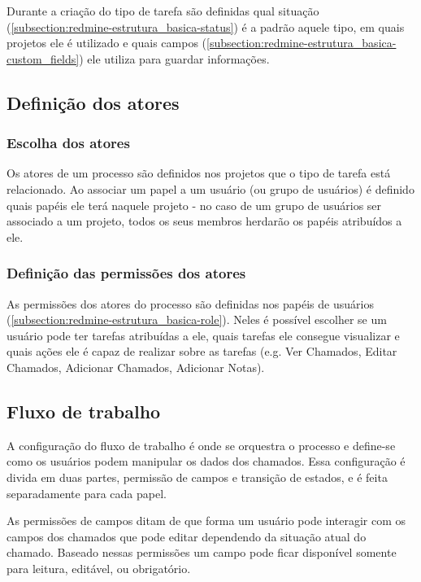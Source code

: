 Durante a criação do tipo de tarefa são definidas qual situação (\ref{subsection:redmine-estrutura_basica-status}) é a padrão aquele tipo, em quais projetos ele é utilizado e quais campos (\ref{subsection:redmine-estrutura_basica-custom_fields}) ele utiliza para guardar informações.

\subsection{Definição dos atores}\label{subsection:redmine-automatizar_processo-atores}

\subsubsection{Escolha dos atores}

Os atores de um processo são definidos nos projetos que o tipo de tarefa está relacionado. Ao associar um papel a um usuário (ou grupo de usuários) é definido quais papéis ele terá naquele projeto - no caso de um grupo de usuários ser associado a um projeto, todos os seus membros herdarão os papéis atribuídos a ele.

\subsubsection{Definição das permissões dos atores}

As permissões dos atores do processo são definidas nos papéis de usuários (\ref{subsection:redmine-estrutura_basica-role}). Neles é possível escolher se um usuário pode ter tarefas atribuídas a ele, quais tarefas ele consegue visualizar e quais ações ele é capaz de realizar sobre as tarefas (e.g. Ver Chamados, Editar Chamados, Adicionar Chamados, Adicionar Notas).

\subsection{Fluxo de trabalho}

A configuração do fluxo de trabalho é onde se orquestra o processo e define-se como os usuários podem manipular os dados dos chamados. Essa configuração é divida em duas partes, permissão de campos e transição de estados, e é feita separadamente para cada papel.

As permissões de campos ditam de que forma um usuário pode interagir com os campos dos chamados que pode editar dependendo da situação atual do chamado. Baseado nessas permissões um campo pode ficar disponível somente para leitura, editável, ou obrigatório.


